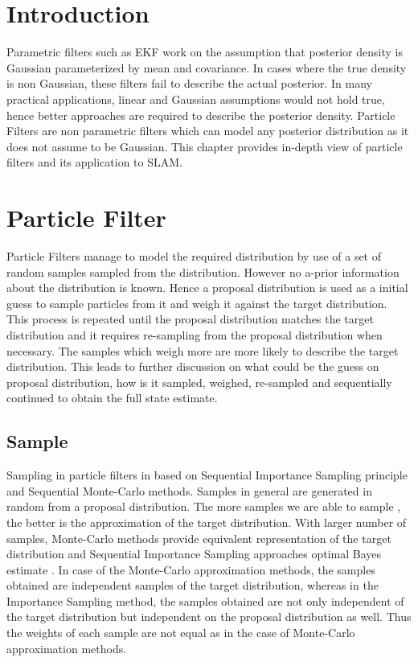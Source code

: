 \section*{Introduction}
Parametric filters such as EKF work on the assumption that posterior density is Gaussian parameterized by mean and covariance. In cases where the true density is non Gaussian, these filters fail to describe the actual posterior. In many practical applications, linear and Gaussian assumptions would not hold true, hence better approaches are required to describe the posterior density. Particle Filters are non parametric filters which can model any posterior distribution as it does not assume to be Gaussian. This chapter provides in-depth view of particle filters and its application to SLAM.
\section{Particle Filter}
Particle Filters manage to model the required distribution by use of a set of random samples sampled from the distribution. However no a-prior information about the distribution is known. Hence a proposal distribution is used as a initial guess to sample particles from it and weigh it against the target distribution. This process is repeated until the proposal distribution matches the target distribution and it requires re-sampling from the proposal distribution when necessary. The samples which weigh more are more likely to describe the target distribution. This leads to further discussion on what could be the guess on proposal distribution, how is it sampled, weighed, re-sampled and sequentially continued to obtain the full state estimate.

\subsection{Sample}
Sampling in particle filters in based on Sequential Importance Sampling principle and Sequential Monte-Carlo methods. Samples in general are generated in random from a proposal distribution. The more samples we are able to sample , the better is the approximation of the target distribution. With larger number of samples, Monte-Carlo methods provide equivalent representation of the target distribution and Sequential Importance Sampling approaches optimal Bayes estimate \cite{S.Arulampalam}. In case of the Monte-Carlo approximation methods, the samples obtained are independent samples of the target distribution, whereas in the Importance Sampling method, the samples obtained are not only independent of the target distribution but independent on the proposal distribution as well. Thus the weights of each sample are not equal as in the case of Monte-Carlo approximation methods.

